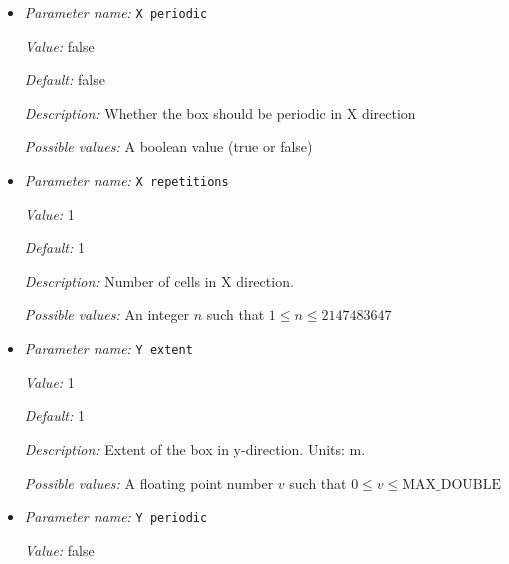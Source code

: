 \begin{itemize}
{\it Value:} 1


{\it Default:} 1


{\it Description:} Extent of the box in x-direction. Units: m.


{\it Possible values:} A floating point number $v$ such that $0 \leq v \leq \text{MAX\_DOUBLE}$
\item {\it Parameter name:} {\tt X periodic}
\label{parameters:Geometry model/Box/X periodic}
\label{parameters:Geometry_20model/Box/X_20periodic}


{\it Value:} false


{\it Default:} false


{\it Description:} Whether the box should be periodic in X direction


{\it Possible values:} A boolean value (true or false)
\item {\it Parameter name:} {\tt X repetitions}
\label{parameters:Geometry model/Box/X repetitions}
\label{parameters:Geometry_20model/Box/X_20repetitions}


{\it Value:} 1


{\it Default:} 1


{\it Description:} Number of cells in X direction.


{\it Possible values:} An integer $n$ such that $1\leq n \leq 2147483647$
\item {\it Parameter name:} {\tt Y extent}
\label{parameters:Geometry model/Box/Y extent}
\label{parameters:Geometry_20model/Box/Y_20extent}


{\it Value:} 1


{\it Default:} 1


{\it Description:} Extent of the box in y-direction. Units: m.


{\it Possible values:} A floating point number $v$ such that $0 \leq v \leq \text{MAX\_DOUBLE}$
\item {\it Parameter name:} {\tt Y periodic}
\label{parameters:Geometry model/Box/Y periodic}
\label{parameters:Geometry_20model/Box/Y_20periodic}


{\it Value:} false



\end{itemize}
